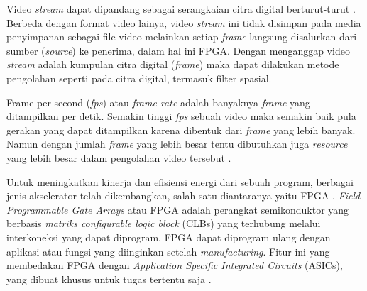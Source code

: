 Video \textit{stream} dapat dipandang sebagai serangkaian citra digital berturut-turut \cite{thesis:jin}. Berbeda dengan format video lainya, video \textit{stream} ini tidak disimpan pada media penyimpanan sebagai file video melainkan setiap \textit{frame} langsung disalurkan dari sumber (\textit{source}) ke penerima, dalam hal ini FPGA. Dengan menganggap video \textit{stream} adalah kumpulan citra digital (\textit{frame}) maka dapat dilakukan metode pengolahan seperti pada citra digital, termasuk filter spasial. 

Frame per second (\textit{fps}) atau \textit{frame rate} adalah banyaknya \textit{frame} yang ditampilkan per detik. Semakin tinggi \textit{fps} sebuah video maka semakin baik pula gerakan yang dapat ditampilkan karena dibentuk dari \textit{frame} yang lebih banyak. Namun dengan jumlah \textit{frame} yang lebih besar tentu dibutuhkan juga \textit{resource} yang lebih besar dalam pengolahan video tersebut \cite{pdf:marcin}. 






Untuk meningkatkan kinerja dan efisiensi energi dari sebuah program, berbagai jenis akselerator telah dikembangkan, salah satu diantaranya yaitu FPGA \cite{lb:cong}. \textit{Field Programmable Gate Arrays} atau FPGA adalah perangkat semikonduktor yang berbasis \textit{matriks configurable logic block} (CLBs) yang terhubung melalui interkoneksi yang dapat diprogram. FPGA dapat diprogram ulang dengan aplikasi atau fungsi yang diinginkan setelah \textit{manufacturing}. Fitur ini yang membedakan FPGA dengan \textit{Application Specific Integrated Circuits} (ASICs), yang dibuat khusus untuk tugas tertentu saja \cite{XILINX}.

